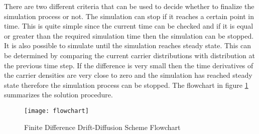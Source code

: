 \begin{doublespace}
 There are two different criteria that can be used to decide whether to finalize the simulation process or not. The simulation can stop if it reaches a certain point in time. This is quite simple since the current time can be checked and if it is equal or greater than the required simulation time then the simulation can be stopped. It is also possible to simulate until the simulation reaches steady state. This can be determined by comparing the current carrier distributions with distribution at the previous time step. If the difference is very small then the time derivatives of the carrier densities are very close to zero and the simulation has reached steady state therefore the simulation process can be stopped. The flowchart in figure \ref{flowchart} summarizes the solution procedure.


\clearpage

\begin{figure}
\centering
\texttt{[image: flowchart]}
\caption{Finite Difference Drift-Diffusion Scheme Flowchart} 
\label{flowchart}
\end{figure}

\end{doublespace}
